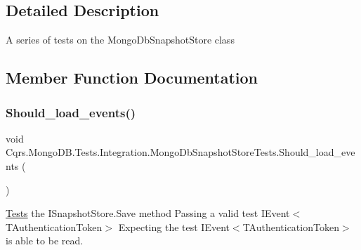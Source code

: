 \subsection{Detailed Description}
A series of tests on the Mongo\+Db\+Snapshot\+Store class 



\subsection{Member Function Documentation}
\mbox{\label{classCqrs_1_1MongoDB_1_1Tests_1_1Integration_1_1MongoDbSnapshotStoreTests_a424d10448b3ab5ab019f99078f895f83_a424d10448b3ab5ab019f99078f895f83}} 
\subsubsection{\texorpdfstring{Should\+\_\+load\+\_\+events()}{Should\_load\_events()}}
{\footnotesize\ttfamily void Cqrs.\+Mongo\+D\+B.\+Tests.\+Integration.\+Mongo\+Db\+Snapshot\+Store\+Tests.\+Should\+\_\+load\+\_\+events (\begin{DoxyParamCaption}{ }\end{DoxyParamCaption})}



\hyperlink{namespaceCqrs_1_1MongoDB_1_1Tests}{Tests} the I\+Snapshot\+Store.\+Save method Passing a valid test I\+Event$<$\+T\+Authentication\+Token$>$ Expecting the test I\+Event$<$\+T\+Authentication\+Token$>$ is able to be read. 

